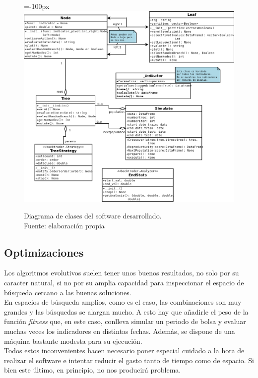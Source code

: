      	\begin{figure}[H]
    		\centering\leftskip=-100px
    		\includegraphics[scale=0.60]{imagenes/diagramaClases.png}
    	    \caption[Diagrama de clases del software desarrollado.]{Diagrama de clases del software desarrollado.\\ Fuente: elaboraci\'on propia}
    		\label{fig:diagclases}
	   \end{figure}

\subsection{Optimizaciones}\label{sec:timeimprove}

Los algoritmos evolutivos suelen tener unos buenos resultados, no solo por su caracter natural, si no por su amplia capacidad para inspeccionar el espacio de b\'usqueda cercano a las buenas soluciones.\\

En espacios de b\'usqueda amplios, como es el caso, las combinaciones son muy grandes y las b\'usquedas se alargan mucho. A esto hay que a\~nadirle el peso de la funci\'on \textit{fitness} que, en este caso, conlleva simular un periodo de bolsa y evaluar muchas veces los indicadores en distintas fechas. Adem\'as, se dispone de una m\'aquina bastante modesta para su ejecuci\'on.\\

Todos estos inconvenientes hacen necesario poner especial cuidado a la hora de realizar el software e intentar reducir el gasto tanto de tiempo como de espacio. Si bien este \'ultimo, en principio, no nos producir\'a problema.\\

